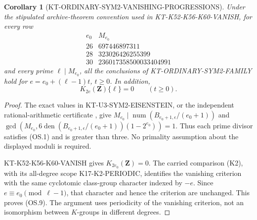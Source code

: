 \documentclass[11pt,a4paper]{article}
\newtheorem{corollary}[theorem]{Corollary}
\theoremstyle{definition}
\begin{document}
\begin{corollary}[KT-ORDINARY-SYM2-VANISHING-PROGRESSIONS]
Under the stipulated archive-theorem convention used in
KT-K52-K56-K60-VANISH, for every row
\[
\begin{array}{c|r}
e_0&M_{e_0}\\\hline
26&697446897311\\
28&323026426255399\\
30&236017358500033404991
\end{array}                                                   \tag{OS.8}
\]
and every prime $\ell\mid M_{e_0}$, all the conclusions of
KT-ORDINARY-SYM2-FAMILY hold for
$e=e_0+(\ell-1)t$, $t\geq0$. In addition,
\[
                  K_{2e}(\mathbf Z)\{\ell\}=0
                           \qquad(t\geq0).                   \tag{OS.9}
\]
\end{corollary}
\begin{proof}
The exact values in KT-U3-SYM2-EISENSTEIN, or the independent
rational-arithmetic certificate
, give
$M_{e_0}\mid\operatorname{num}(B_{e_0+1,\epsilon}/(e_0+1))$
and
$\gcd(M_{e_0},6\operatorname{den}(B_{e_0+1,\epsilon}/(e_0+1))
 (1-2^{e_0}))=1$.
Thus each prime divisor satisfies (OS.1) and is greater than
three. No primality assumption about the displayed moduli
is required.

KT-K52-K56-K60-VANISH gives $K_{2e_0}(\mathbf Z)=0$.
The carried comparison (K2), with its all-degree scope
K17-K2-PERIODIC, identifies the vanishing criterion with the
same cyclotomic class-group character indexed by $-e$.
Since $e\equiv e_0\pmod{\ell-1}$, that character and hence
the criterion are unchanged. This proves (OS.9). The
argument uses periodicity of the vanishing criterion, not
an isomorphism between $K$-groups in different degrees.
\end{proof}
\end{document}
